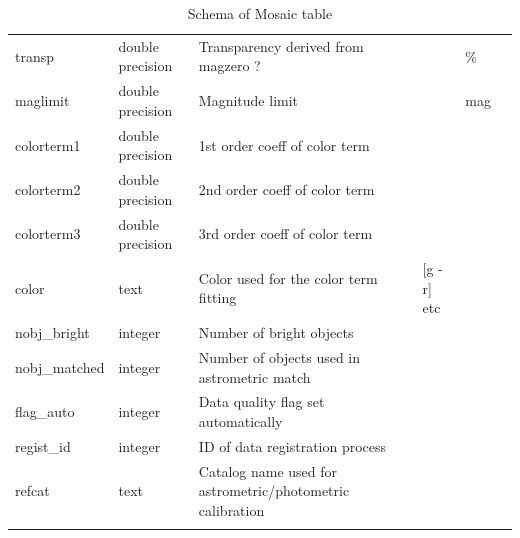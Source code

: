 \documentclass[12pt]{article}
\begin{document}
\begin{table}[thbp]
\begin{center}
{\begin{tabular}{llllll}
transp & double precision & Transparency derived from magzero ?                      &                           & \%                &             \\
maglimit & double precision & Magnitude limit                                          &                           & mag              &             \\
colorterm1 & double precision & 1st order coeff of color term                            &                           &                  &             \\
colorterm2 & double precision & 2nd order coeff of color term                            &                           &                  &             \\
colorterm3 & double precision & 3rd order coeff of color term                            &                           &                  &             \\
color & text & Color used for the color term fitting                    & [g - r] etc               &                  &             \\
nobj\_bright & integer & Number of bright objects                                 &                           &                  &             \\
nobj\_matched & integer & Number of objects used in astrometric match              &                           &                  &             \\
flag\_auto & integer & Data quality flag set automatically                      &                           &                  &             \\
regist\_id & integer & ID of data registration process                          &                           &                  &             \\
refcat & text & Catalog name used for astrometric/photometric calibration      &                           &                  &             \\
\hline\\
\end{tabular}
}
\caption{Schema of Mosaic table}
\end{center}
\end{table}
\end{document}
